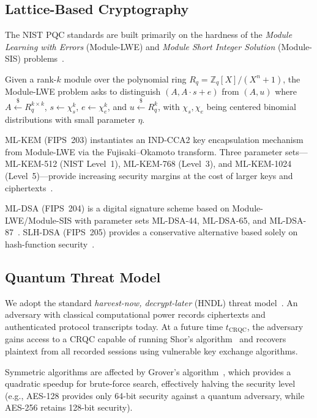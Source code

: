 \documentclass[conference,10pt]{IEEEtran}
\begin{document}
\subsection{Lattice-Based Cryptography}

The NIST PQC standards are built primarily on the hardness of the
\emph{Module Learning with Errors} (Module-LWE) and \emph{Module Short
Integer Solution} (Module-SIS) problems~\cite{langlois2015}.

\begin{definition}
Given a rank-$k$ module over the polynomial ring
$R_q = \mathbb{Z}_q[X]/(X^n+1)$, the Module-LWE problem asks to
distinguish $(A, A \cdot s + e)$ from $(A, u)$ where
$A \xleftarrow{\$} R_q^{k \times k}$,
$s \xleftarrow{} \chi_s^k$,
$e \xleftarrow{} \chi_e^k$, and
$u \xleftarrow{\$} R_q^k$, with $\chi_s, \chi_e$ being centered
binomial distributions with small parameter $\eta$.
\end{definition}

ML-KEM (FIPS~203) instantiates an IND-CCA2 key encapsulation mechanism
from Module-LWE via the Fujisaki--Okamoto transform.  Three parameter
sets---ML-KEM-512 (NIST Level~1), ML-KEM-768 (Level~3), and ML-KEM-1024
(Level~5)---provide increasing security margins at the cost of larger
keys and ciphertexts~\cite{nist-fips203}.

ML-DSA (FIPS~204) is a digital signature scheme based on
Module-LWE/Module-SIS with parameter sets ML-DSA-44, ML-DSA-65, and
ML-DSA-87~\cite{nist-fips204}. SLH-DSA (FIPS~205) provides a
conservative alternative based solely on hash-function
security~\cite{nist-fips205}.

\subsection{Quantum Threat Model}

We adopt the standard \emph{harvest-now, decrypt-later} (HNDL) threat
model~\cite{mavroeidis2018}. An adversary with classical computational
power records ciphertexts and authenticated protocol transcripts today.
At a future time $t_{\text{CRQC}}$, the adversary gains access to a CRQC
capable of running Shor's algorithm~\cite{shor1997} and recovers
plaintext from all recorded sessions using vulnerable key exchange
algorithms.

Symmetric algorithms are affected by Grover's algorithm~\cite{grover1996},
which provides a quadratic speedup for brute-force search, effectively
halving the security level (e.g., AES-128 provides only 64-bit security
against a quantum adversary, while AES-256 retains 128-bit security).
\end{document}
